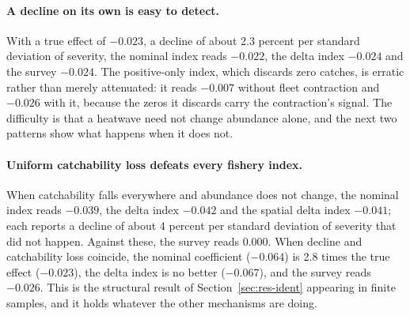 \documentclass[11pt,a4paper]{article}
\begin{document}
\paragraph{A decline on its own is easy to detect.} With a true effect of $-0.023$, a decline of about 2.3 percent per standard deviation of severity, the nominal index reads $-0.022$, the delta index $-0.024$ and the survey $-0.024$. The positive-only index, which discards zero catches, is erratic rather than merely attenuated: it reads $-0.007$ without fleet contraction and $-0.026$ with it, because the zeros it discards carry the contraction's signal. The difficulty is that a heatwave need not change abundance alone, and the next two patterns show what happens when it does not.

\paragraph{Uniform catchability loss defeats every fishery index.} When catchability falls everywhere and abundance does not change, the nominal index reads $-0.039$, the delta index $-0.042$ and the spatial delta index $-0.041$; each reports a decline of about 4 percent per standard deviation of severity that did not happen. Against these, the survey reads $0.000$. When decline and catchability loss coincide, the nominal coefficient ($-0.064$) is 2.8 times the true effect ($-0.023$), the delta index is no better ($-0.067$), and the survey reads $-0.026$. This is the structural result of Section~\ref{sec:res-ident} appearing in finite samples, and it holds whatever the other mechanisms are doing.
\end{document}
